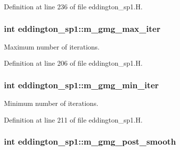Definition at line 236 of file eddington\+\_\+sp1.\+H.

\subsubsection[{\texorpdfstring{m\+\_\+gmg\+\_\+max\+\_\+iter}{m_gmg_max_iter}}]{\setlength{\rightskip}{0pt plus 5cm}int eddington\+\_\+sp1\+::m\+\_\+gmg\+\_\+max\+\_\+iter\hspace{0.3cm}{\ttfamily [protected]}}\hypertarget{classeddington__sp1_aed92e46b2ea16a4e8aa3e35faeaf5153}{}\label{classeddington__sp1_aed92e46b2ea16a4e8aa3e35faeaf5153}


Maximum number of iterations. 



Definition at line 206 of file eddington\+\_\+sp1.\+H.

\subsubsection[{\texorpdfstring{m\+\_\+gmg\+\_\+min\+\_\+iter}{m_gmg_min_iter}}]{\setlength{\rightskip}{0pt plus 5cm}int eddington\+\_\+sp1\+::m\+\_\+gmg\+\_\+min\+\_\+iter\hspace{0.3cm}{\ttfamily [protected]}}\hypertarget{classeddington__sp1_a7d97061b784f9b1d477ac79b94292a73}{}\label{classeddington__sp1_a7d97061b784f9b1d477ac79b94292a73}


Minimum number of iterations. 



Definition at line 211 of file eddington\+\_\+sp1.\+H.

\subsubsection[{\texorpdfstring{m\+\_\+gmg\+\_\+post\+\_\+smooth}{m_gmg_post_smooth}}]{\setlength{\rightskip}{0pt plus 5cm}int eddington\+\_\+sp1\+::m\+\_\+gmg\+\_\+post\+\_\+smooth\hspace{0.3cm}{\ttfamily [protected]}}\hypertarget{classeddington__sp1_aee5dbd38bd6d7095e1f794225b011b7f}{}\label{classeddington__sp1_aee5dbd38bd6d7095e1f794225b011b7f}


